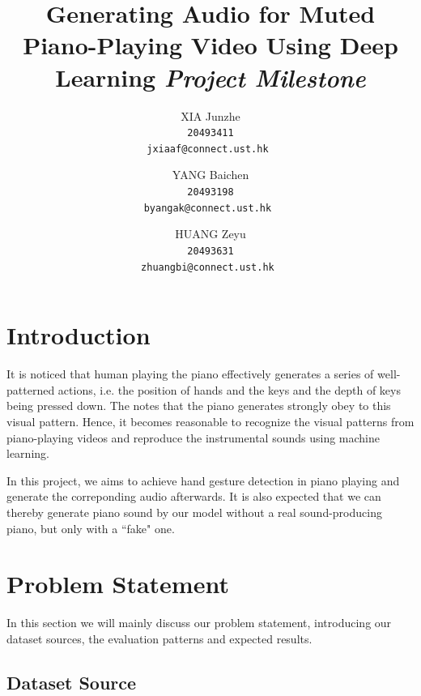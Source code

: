 \documentclass[10pt,twocolumn,letterpaper]{article}
\begin{document}
\title{Generating Audio for Muted Piano-Playing Video Using Deep Learning \newline \newline \textit{Project Milestone}}


\author{XIA Junzhe\\
\tt\small 20493411\\
{\tt\small jxiaaf@connect.ust.hk}
\and
YANG Baichen\\
\tt\small 20493198\\
{\tt\small byangak@connect.ust.hk}
\and
HUANG Zeyu\\
\tt\small 20493631\\
{\tt\small zhuangbi@connect.ust.hk}
}


\maketitle

\section{Introduction}

It is noticed that human playing the piano effectively generates a series of well-patterned actions,
i.e. the position of hands and the keys and the depth of keys being pressed down.
The notes that the piano generates strongly obey to this visual pattern.
Hence, it becomes reasonable to recognize the visual patterns from piano-playing videos and reproduce the instrumental sounds using machine learning.

In this project, we aims to achieve hand gesture detection in piano playing and generate the correponding audio afterwards.
It is also expected that we can thereby generate piano sound by our model without a real sound-producing piano, but only with a ``fake" one.

\section{Problem Statement}
In this section we will mainly discuss our problem statement, introducing our dataset sources, the evaluation patterns and expected results.

\subsection{Dataset Source}
\label{source}
\end{document}
